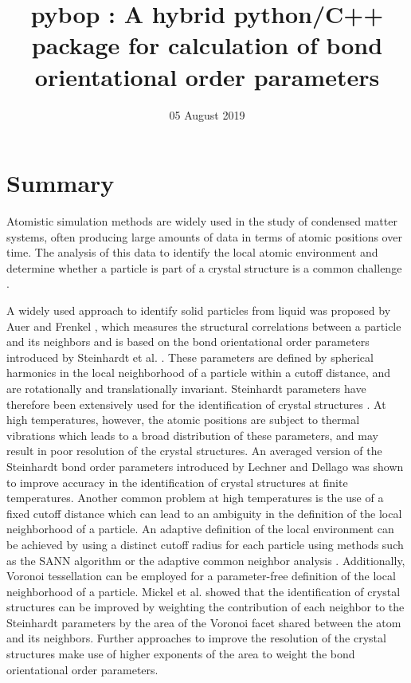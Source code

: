 \documentclass[]{article}
\title{pybop : A hybrid python/C++ package for calculation of bond
orientational order parameters}
\date{05 August 2019}
\begin{document}
\maketitle

\section{Summary}\label{summary}

Atomistic simulation methods are widely used in the study of condensed
matter systems, often producing large amounts of data in terms of atomic
positions over time. The analysis of this data to identify the local
atomic environment and determine whether a particle is part of a crystal
structure is a common challenge \citep{Stukowski:2012}.

A widely used approach to identify solid particles from liquid was
proposed by Auer and Frenkel \citep{Auer:2005}, which measures the
structural correlations between a particle and its neighbors and is
based on the bond orientational order parameters introduced by
Steinhardt et al. \citep{Steinhardt:1983}. These parameters are defined
by spherical harmonics in the local neighborhood of a particle within a
cutoff distance, and are rotationally and translationally invariant.
Steinhardt parameters have therefore been extensively used for the
identification of crystal structures \citep[ and references
within]{Mickel:2013}. At high temperatures, however, the atomic
positions are subject to thermal vibrations which leads to a broad
distribution of these parameters, and may result in poor resolution of
the crystal structures. An averaged version of the Steinhardt bond order
parameters introduced by Lechner and Dellago \citep{Lechner:2008} was
shown to improve accuracy in the identification of crystal structures at
finite temperatures. Another common problem at high temperatures is the
use of a fixed cutoff distance which can lead to an ambiguity in the
definition of the local neighborhood of a particle. An adaptive
definition of the local environment can be achieved by using a distinct
cutoff radius for each particle using methods such as the SANN algorithm
\citep{VanMeel:2012} or the adaptive common neighbor analysis
\citep{Stukowski:2012}. Additionally, Voronoi tessellation can be
employed for a parameter-free definition of the local neighborhood of a
particle. Mickel et al. showed \citep{Mickel:2013} that the
identification of crystal structures can be improved by weighting the
contribution of each neighbor to the Steinhardt parameters by the area
of the Voronoi facet shared between the atom and its neighbors. Further
approaches to improve the resolution of the crystal structures make use
of higher exponents of the area to weight the bond orientational order
parameters\citep{Haeberle:2019}.
\end{document}
